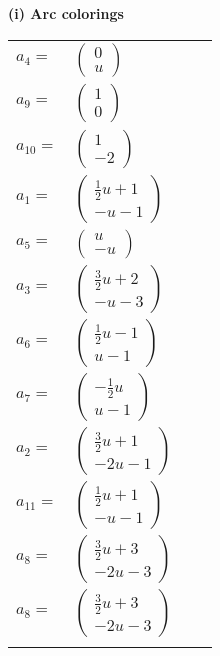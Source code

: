 \documentclass[1p]{elsarticle_modified}
\theoremstyle{definition}
\begin{document}
\flushleft \textbf{(i) Arc colorings}\\
\begin{tabular}{m{7pt} m{180pt} m{7pt} m{180pt} }
\flushright $a_{4}=$&$\begin{pmatrix}0\\u\end{pmatrix}$ \\
\flushright $a_{9}=$&$\begin{pmatrix}1\\0\end{pmatrix}$ \\
\flushright $a_{10}=$&$\begin{pmatrix}1\\-2\end{pmatrix}$ \\
\flushright $a_{1}=$&$\begin{pmatrix}\frac{1}{2} u+1\\- u-1\end{pmatrix}$ \\
\flushright $a_{5}=$&$\begin{pmatrix}u\\- u\end{pmatrix}$ \\
\flushright $a_{3}=$&$\begin{pmatrix}\frac{3}{2} u+2\\- u-3\end{pmatrix}$ \\
\flushright $a_{6}=$&$\begin{pmatrix}\frac{1}{2} u-1\\u-1\end{pmatrix}$ \\
\flushright $a_{7}=$&$\begin{pmatrix}-\frac{1}{2} u\\u-1\end{pmatrix}$ \\
\flushright $a_{2}=$&$\begin{pmatrix}\frac{3}{2} u+1\\-2 u-1\end{pmatrix}$ \\
\flushright $a_{11}=$&$\begin{pmatrix}\frac{1}{2} u+1\\- u-1\end{pmatrix}$ \\
\flushright $a_{8}=$&$\begin{pmatrix}\frac{3}{2} u+3\\-2 u-3\end{pmatrix}$\\ \flushright $a_{8}=$&$\begin{pmatrix}\frac{3}{2} u+3\\-2 u-3\end{pmatrix}$\\&\end{tabular}
\end{document}
